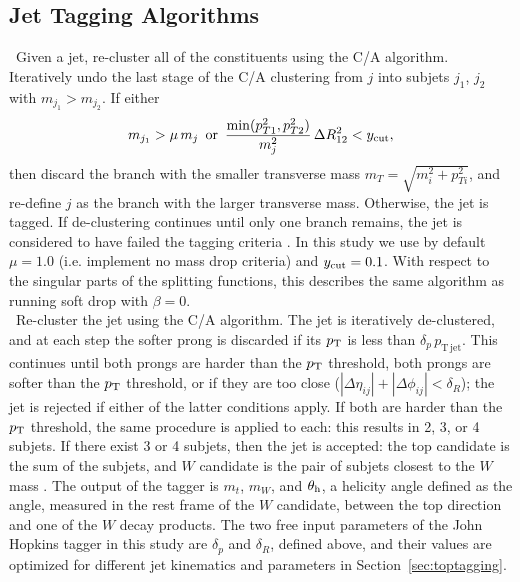  
 
\subsection{Jet Tagging Algorithms}
\label{sec:taggers}

~Given a jet, re-cluster all of the constituents using the C/A algorithm. Iteratively undo the last stage of the C/A clustering from $j$ into subjets $j_1$, $j_2$ with $m_{j_1}>m_{j_2}$. If either
%
\begin{equation}
m_{j_1} > \mu \, m_j\,\,\,\mathrm{or}\,\,\, \frac{\mathrm{min}(p_{T1}^2,p_{T2}^2)}{m_j^2}\,\Delta R_{12}^2 < y_{\rm cut},
\end{equation}
%
then discard the branch with the smaller transverse mass $m_T = \sqrt{m_i^2 + p_{Ti}^2}$, and re-define $j$ as the branch with the larger transverse mass. Otherwise, the jet is tagged. If de-clustering continues until only one branch remains, the jet is considered to have failed the tagging criteria \cite{Dasgupta:2013ihk}. In this study we use by default $\mu = 1.0$ (i.e. implement no mass drop criteria) and $y_{\rm cut} = 0.1$. With respect to the singular parts of the splitting functions, this describes the same algorithm as running soft drop with $\beta = 0$. \\


~Re-cluster the jet using the C/A algorithm. The jet is iteratively de-clustered, and at each step the softer prong is discarded if its $p_{\rm T}$ is less than $\delta_p\,p_{\mathrm{T\,jet}}$. This continues until both prongs are harder than the $p_{\rm T}$ threshold, both prongs are softer than the $p_{\rm T}$ threshold, or if they are too close ($|\Delta\eta_{ij}|+|\Delta\phi_{ij}|<\delta_R$); the jet is rejected if either of the latter conditions apply. If both are harder than the $p_{\rm T}$ threshold, the same procedure is applied to each: this results in 2, 3, or 4 subjets. If there exist 3 or 4 subjets, then the jet is accepted: the top candidate is the sum of the subjets, and $W$ candidate is the pair of subjets closest to the $W$ mass \cite{Kaplan:2008ie}. The output of the tagger is $m_t$, $m_W$, and $\theta_{\rm h}$, a helicity angle defined as the angle, measured in the rest frame of the $W$ candidate, between the top direction and one of the $W$ decay products. The two free input parameters of the John Hopkins tagger in this study are $\delta_p$ and $\delta_R$, defined above, and their values are optimized for different jet kinematics and parameters in Section~\ref{sec:toptagging}.\\

